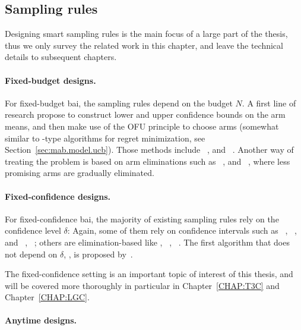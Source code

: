 \subsection{Sampling rules}\label{sec:mab.bai.sampling}

Designing smart sampling rules is the main focus of a large part of the thesis, thus we only survey the related work in this chapter, and leave the technical details to subsequent chapters.

\paragraph{Fixed-budget designs.}

For fixed-budget \gls{bai}, the sampling rules depend on the budget $N$. A first line of research propose to construct lower and upper confidence bounds on the arm means, and then make use of the OFU principle to choose arms (somewhat similar to \UCB-type algorithms for regret minimization, see Section~\ref{sec:mab.model.ucb}). Those methods include \UCBE~\citep{audibert2010budget}, and \UGapE~\citep{gabillon2012ugape}. Another way of treating the problem is based on arm eliminations such as \SR~\citep{audibert2010budget}, and \SHA~\citep{karnin2013sha}, where less promising arms are gradually eliminated.

\paragraph{Fixed-confidence designs.}

For fixed-confidence \gls{bai}, the majority of existing sampling rules rely on the confidence level $\delta$: Again, some of them rely on confidence intervals such as \LUCB~\citep{kalyanakrishnan2012lucb}, \UGapE~\citep{gabillon2012ugape}, \KLLUCB and \KLRacing~\citep{kaufmann2013kl}, \LIL~\citep{jamieson2014lilucb}; others are elimination-based like \SE, \ME~\citep{even-dar2003confidence}, \EGE~\citep{karnin2013sha}. The first algorithm that does not depend on $\delta$, \Track, is proposed by~\cite{garivier2016tracknstop}.

The fixed-confidence setting is an important topic of interest of this thesis, and will be covered more thoroughly in particular in Chapter~\ref{CHAP:T3C} and Chapter~\ref{CHAP:LGC}.

\paragraph{Anytime designs.}

